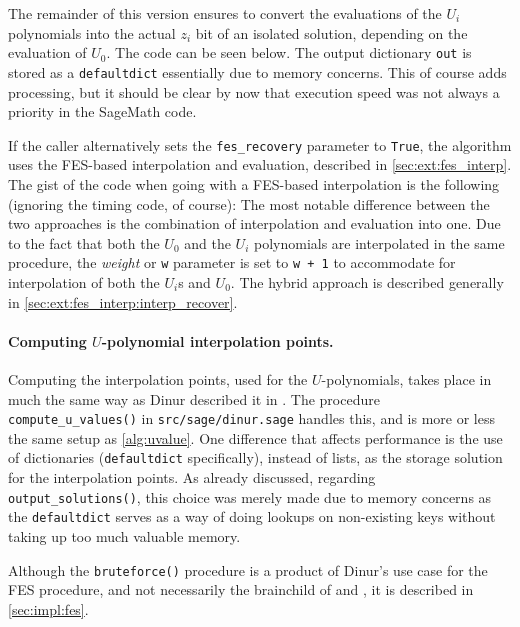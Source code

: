 
The remainder of this version ensures to convert the evaluations of the $U_i$ polynomials into the actual $z_i$ bit of an isolated solution, depending on the evaluation of $U_0$. The code can be seen below.
The output dictionary \texttt{out} is stored as a \texttt{defaultdict} essentially due to memory concerns. This of course adds processing, but it should be clear by now that execution speed was not always a priority in the SageMath code.

If the caller alternatively sets the \texttt{fes\_recovery} parameter to \texttt{True}, the algorithm uses the FES-based interpolation and evaluation, described in \cref{sec:ext:fes_interp}. The gist of the code when going with a FES-based interpolation is the following (ignoring the timing code, of course):
The most notable difference between the two approaches is the combination of interpolation and evaluation into one. Due to the fact that both the $U_0$ and the $U_i$ polynomials are interpolated in the same procedure, the \textit{weight} or \texttt{w} parameter is set to \texttt{w + 1} to accommodate for interpolation of both the $U_i$s and $U_0$. The hybrid approach is described generally in \cref{sec:ext:fes_interp:interp_recover}.

\paragraph{Computing $U$-polynomial interpolation points.} Computing the interpolation points, used for the $U$-polynomials, takes place in much the same way as Dinur described it in \cite{eurocrypt-2021-30841}. The procedure \texttt{compute\_u\_values()} in \texttt{src/sage/dinur.sage} handles this, and is more or less the same setup as \cref{alg:uvalue}. One difference that affects performance is the use of dictionaries (\texttt{defaultdict} specifically), instead of lists, as the storage solution for the interpolation points.
As already discussed, regarding \texttt{output\_solutions()}, this choice was merely made due to memory concerns as the \texttt{defaultdict} serves as a way of doing lookups on non-existing keys without taking up too much valuable memory.

Although the \texttt{bruteforce()} procedure is a product of Dinur's use case for the FES procedure, and not necessarily the brainchild of \cite{cryptoeprint:2013/436} and \cite{ches-2010-23990}, it is described in \cref{sec:impl:fes}.


